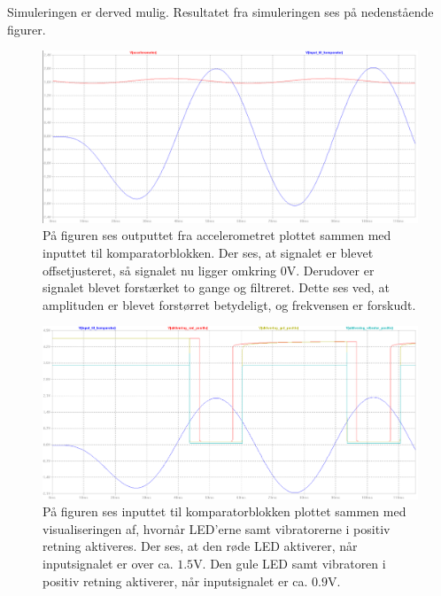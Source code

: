 \noindent Simuleringen er derved mulig. Resultatet fra simuleringen ses på nedenstående figurer.
\begin{figure}[H]
	\centering
	\includegraphics[scale=.3]{figures/cProblemloesning/Samlet_system_sim12.PNG}
	\caption{På figuren ses outputtet fra accelerometret plottet sammen med inputtet til komparatorblokken. Der ses, at signalet er blevet offsetjusteret, så signalet nu ligger omkring 0V. Derudover er signalet blevet forstærket to gange og filtreret. Dette ses ved, at amplituden er blevet forstørret betydeligt, og frekvensen er forskudt.}
	\label{fig:samlet_system_sim1}
\end{figure}
\begin{figure}[H]
	\centering
	\includegraphics[scale=.3]{figures/cProblemloesning/Samlet_system_sim3.PNG}
	\caption{På figuren ses inputtet til komparatorblokken plottet sammen med visualiseringen af, hvornår LED'erne samt vibratorerne i positiv retning aktiveres. Der ses, at den røde LED aktiverer, når inputsignalet er over ca. $1.5$V. Den gule LED samt vibratoren i positiv retning aktiverer, når inputsignalet er ca. $0.9$V.}
	\label{fig:samlet_system_sim2}
\end{figure}
